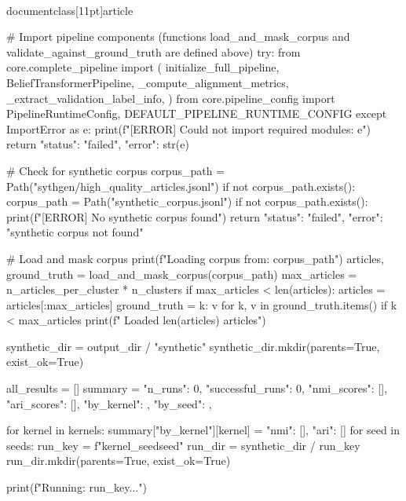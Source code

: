 \\documentclass[11pt]{article}
\begin{document}
\begin{CodeBlock}
    # Import pipeline components (functions load_and_mask_corpus and validate_against_ground_truth are defined above)
    try:
        from core.complete_pipeline import (
            initialize_full_pipeline,
            BeliefTransformerPipeline,
            _compute_alignment_metrics,
            _extract_validation_label_info,
        )
        from core.pipeline_config import PipelineRuntimeConfig, DEFAULT_PIPELINE_RUNTIME_CONFIG
    except ImportError as e:
        print(f"[ERROR] Could not import required modules: {e}")
        return {"status": "failed", "error": str(e)}

    # Check for synthetic corpus
    corpus_path = Path("sythgen/high_quality_articles.jsonl")
    if not corpus_path.exists():
        corpus_path = Path("synthetic_corpus.jsonl")
    if not corpus_path.exists():
        print(f"[ERROR] No synthetic corpus found")
        return {"status": "failed", "error": "synthetic corpus not found"}

    # Load and mask corpus
    print(f"\n  Loading corpus from: {corpus_path}")
    articles, ground_truth = load_and_mask_corpus(corpus_path)
    max_articles = n_articles_per_cluster * n_clusters
    if max_articles < len(articles):
        articles = articles[:max_articles]
        ground_truth = {k: v for k, v in ground_truth.items() if k < max_articles}
    print(f"  Loaded {len(articles)} articles")

    synthetic_dir = output_dir / "synthetic"
    synthetic_dir.mkdir(parents=True, exist_ok=True)

    all_results = []
    summary = {
        "n_runs": 0,
        "successful_runs": 0,
        "nmi_scores": [],
        "ari_scores": [],
        "by_kernel": {},
        "by_seed": {},
    }

    for kernel in kernels:
        summary["by_kernel"][kernel] = {"nmi": [], "ari": []}
        for seed in seeds:
            run_key = f"{kernel}_seed{seed}"
            run_dir = synthetic_dir / run_key
            run_dir.mkdir(parents=True, exist_ok=True)

            print(f"\n  Running: {run_key}...")


\end{CodeBlock}
\end{document}
